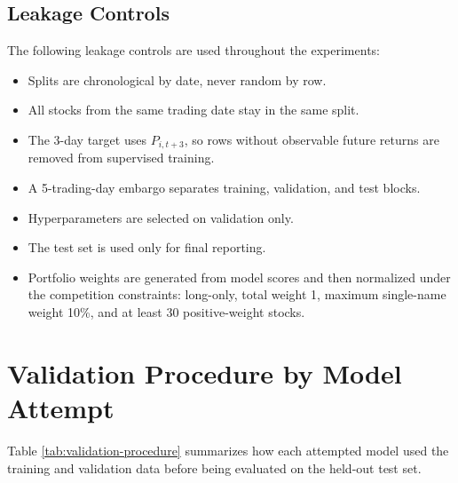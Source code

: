\documentclass[11pt]{article}
\begin{document}
\subsection{Leakage Controls}

The following leakage controls are used throughout the experiments:
\begin{itemize}
    \item Splits are chronological by date, never random by row.
    \item All stocks from the same trading date stay in the same split.
    \item The 3-day target uses \(P_{i,t+3}\), so rows without observable
    future returns are removed from supervised training.
    \item A 5-trading-day embargo separates training, validation, and test
    blocks.
    \item Hyperparameters are selected on validation only.
    \item The test set is used only for final reporting.
    \item Portfolio weights are generated from model scores and then normalized
    under the competition constraints: long-only, total weight 1, maximum
    single-name weight 10\%, and at least 30 positive-weight stocks.
\end{itemize}

\section{Validation Procedure by Model Attempt}

Table \ref{tab:validation-procedure} summarizes how each attempted model used
the training and validation data before being evaluated on the held-out test
set.
\end{document}
